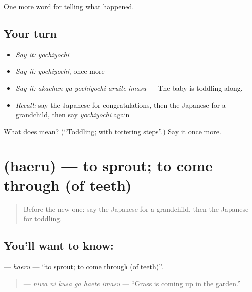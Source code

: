 \begin{grammarlens}[title={What you've built}]
One more word for telling what happened.
\end{grammarlens}

\subsection*{Your turn}
\begin{itemize}
\raggedright
  \item \emph{Say it:} \emph{yochiyochi}
  \item \emph{Say it:} \emph{yochiyochi}, once more
  \item \emph{Say it:} \emph{akachan ga yochiyochi aruite imasu} — The baby is toddling along.
  \item \emph{Recall:} say the Japanese for congratulations, then the Japanese for a grandchild, then say \emph{yochiyochi} again
\end{itemize}

\begin{tcolorbox}[breakable,colback=teal!4,colframe=teal!35!black,title={Before you move on}]
What does  mean? (\textquotedblleft{}Toddling; with tottering steps\textquotedblright{}.) Say it once more.
\end{tcolorbox}
\section[\texorpdfstring{\ja{はえる} (haeru)}{はえる (haeru)}]{ (haeru) — to sprout; to come through (of teeth)}

\label{lesson:JA-C287-haeru}



\begin{quote}
Before the new one: say the Japanese for a grandchild, then the Japanese for toddling.
\end{quote}

\subsection*{You'll want to know: }
\textbf{} — \emph{haeru} — \textquotedblleft{}to sprout; to come through (of teeth)\textquotedblright{}.

\begin{quote}
\textbf{  } — \emph{niwa ni kusa ga haete imasu} — \textquotedblleft{}Grass is coming up in the garden.\textquotedblright{}
\end{quote}

